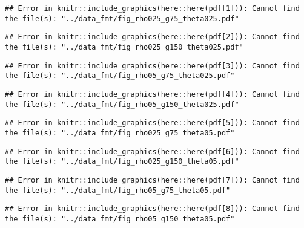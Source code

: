 \begin{verbatim}
## Error in knitr::include_graphics(here::here(pdf[1])): Cannot find the file(s): "../data_fmt/fig_rho025_g75_theta025.pdf"
\end{verbatim}

\newpage

\begin{verbatim}
## Error in knitr::include_graphics(here::here(pdf[2])): Cannot find the file(s): "../data_fmt/fig_rho025_g150_theta025.pdf"
\end{verbatim}

\newpage

\begin{verbatim}
## Error in knitr::include_graphics(here::here(pdf[3])): Cannot find the file(s): "../data_fmt/fig_rho05_g75_theta025.pdf"
\end{verbatim}

\newpage

\begin{verbatim}
## Error in knitr::include_graphics(here::here(pdf[4])): Cannot find the file(s): "../data_fmt/fig_rho05_g150_theta025.pdf"
\end{verbatim}

\newpage

\begin{verbatim}
## Error in knitr::include_graphics(here::here(pdf[5])): Cannot find the file(s): "../data_fmt/fig_rho025_g75_theta05.pdf"
\end{verbatim}

\newpage

\begin{verbatim}
## Error in knitr::include_graphics(here::here(pdf[6])): Cannot find the file(s): "../data_fmt/fig_rho025_g150_theta05.pdf"
\end{verbatim}

\newpage

\begin{verbatim}
## Error in knitr::include_graphics(here::here(pdf[7])): Cannot find the file(s): "../data_fmt/fig_rho05_g75_theta05.pdf"
\end{verbatim}

\newpage

\begin{verbatim}
## Error in knitr::include_graphics(here::here(pdf[8])): Cannot find the file(s): "../data_fmt/fig_rho05_g150_theta05.pdf"
\end{verbatim}

\newpage

